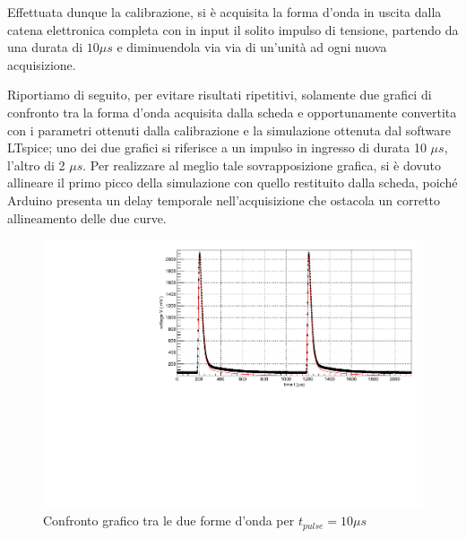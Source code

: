 \documentclass{article}
\begin{document}
Effettuata dunque la calibrazione, si è acquisita la forma d'onda in uscita dalla catena elettronica completa con in input il solito
impulso di tensione, partendo da una durata di $10 \mu s$ e diminuendola via via di un'unità ad ogni nuova acquisizione.

Riportiamo di seguito, per evitare risultati ripetitivi, solamente due grafici di confronto tra la forma d'onda acquisita dalla scheda e opportunamente 
convertita con i parametri ottenuti dalla
calibrazione e la simulazione ottenuta dal software LTspice; uno dei due grafici si riferisce a un impulso in ingresso di durata 10 $\mu s$, l'altro di 2 $\mu s$.
Per realizzare al meglio tale sovrapposizione grafica, si è dovuto allineare il primo picco della simulazione con quello restituito dalla scheda, poiché Arduino
presenta un delay temporale nell'acquisizione che ostacola un corretto allineamento delle due curve.


\begin{center}
\begin{figure}[H]
\centering
\includegraphics[scale=0.4, angle=0]{arduino10.pdf}
\caption{Confronto grafico tra le due forme d'onda per $t_{pulse}=10 \mu s$}
\label{fig:arduino10}
\end{figure}
\end{center}
\end{document}
